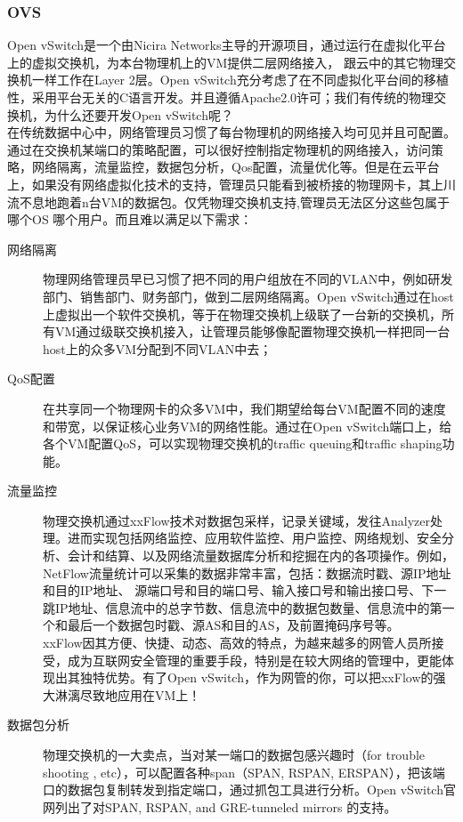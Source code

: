 \documentclass[a4paper, 11pt]{article}                                                   %
\begin{document}
\begin{CJK*}{UTF8}{song}
\subsubsection{OVS}
Open vSwitch是一个由Nicira Networks主导的开源项目，通过运行在虚拟化平台上的虚拟交换机，为本台物理机上的VM提供二层网络接入， 跟云中的其它物理交换机一样工作在Layer 2层。Open vSwitch充分考虑了在不同虚拟化平台间的移植性，采用平台无关的C语言开发。并且遵循Apache2.0许可；我们有传统的物理交换机，为什么还要开发Open vSwitch呢？\\
在传统数据中心中，网络管理员习惯了每台物理机的网络接入均可见并且可配置。通过在交换机某端口的策略配置，可以很好控制指定物理机的网络接入，访问策略，网络隔离，流量监控，数据包分析，Qos配置，流量优化等。但是在云平台上，如果没有网络虚拟化技术的支持，管理员只能看到被桥接的物理网卡，其上川流不息地跑着n台VM的数据包。仅凭物理交换机支持,管理员无法区分这些包属于哪个OS 哪个用户。而且难以满足以下需求：
\begin{description}
  \item[网络隔离] 物理网络管理员早已习惯了把不同的用户组放在不同的VLAN中，例如研发部门、销售部门、财务部门，做到二层网络隔离。Open vSwitch通过在host上虚拟出一个软件交换机，等于在物理交换机上级联了一台新的交换机，所有VM通过级联交换机接入，让管理员能够像配置物理交换机一样把同一台host上的众多VM分配到不同VLAN中去；
  \item[QoS配置] 在共享同一个物理网卡的众多VM中，我们期望给每台VM配置不同的速度和带宽，以保证核心业务VM的网络性能。通过在Open vSwitch端口上，给各个VM配置QoS，可以实现物理交换机的traffic queuing和traffic shaping功能。
  \item[流量监控] 物理交换机通过xxFlow技术对数据包采样，记录关键域，发往Analyzer处理。进而实现包括网络监控、应用软件监控、用户监控、网络规划、安全分析、会计和结算、以及网络流量数据库分析和挖掘在内的各项操作。例如，NetFlow流量统计可以采集的数据非常丰富，包括：数据流时戳、源IP地址和目的IP地址、 源端口号和目的端口号、输入接口号和输出接口号、下一跳IP地址、信息流中的总字节数、信息流中的数据包数量、信息流中的第一个和最后一个数据包时戳、源AS和目的AS，及前置掩码序号等。\\
      xxFlow因其方便、快捷、动态、高效的特点，为越来越多的网管人员所接受，成为互联网安全管理的重要手段，特别是在较大网络的管理中，更能体现出其独特优势。有了Open vSwitch，作为网管的你，可以把xxFlow的强大淋漓尽致地应用在VM上！
  \item[数据包分析] 物理交换机的一大卖点，当对某一端口的数据包感兴趣时（for trouble shooting , etc），可以配置各种span（SPAN, RSPAN, ERSPAN），把该端口的数据包复制转发到指定端口，通过抓包工具进行分析。Open vSwitch官网列出了对SPAN, RSPAN, and GRE-tunneled mirrors 的支持。

\end{description}
\end{CJK*}
\end{document}
